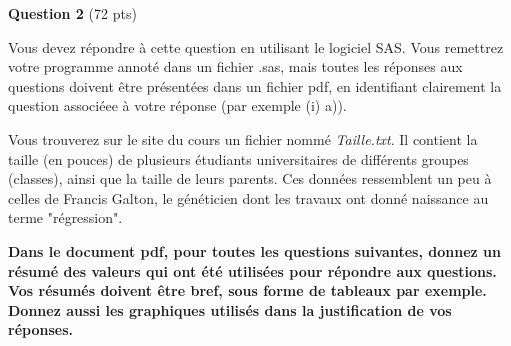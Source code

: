 \documentclass[letter, 11pt]{article}
\begin{document}
\vspace{0.2 in}
\textbf{Question 2} (72 pts)
\vspace{0.1in}

Vous devez répondre à cette question en utilisant le logiciel SAS. Vous remettrez votre programme annoté dans un fichier .sas, mais toutes les réponses aux questions doivent être présentées dans un fichier pdf, en identifiant clairement la question associéee à votre réponse (par exemple (i)
a)).
\vspace{0.1in}

Vous trouverez sur le site du cours un fichier nommé {\it Taille.txt}. Il contient la taille (en pouces) de plusieurs étudiants universitaires de différents groupes (classes), ainsi que la taille de leurs parents. Ces données ressemblent un peu à celles de Francis Galton, le généticien dont les travaux ont donné naissance au terme "régression". 

{\bf Dans le document pdf, pour toutes les questions suivantes, donnez un résumé des valeurs qui ont été utilisées pour répondre aux questions. Vos résumés doivent être bref, sous forme de tableaux par exemple. Donnez aussi les graphiques utilisés dans la justification de vos réponses.}
\end{document}
